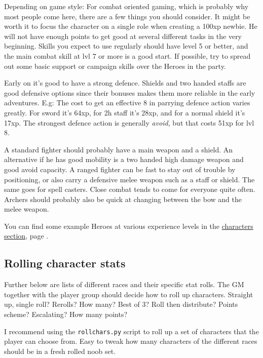 Depending on game style: For combat oriented gaming, which is probably why most people come here, there are a few things you should consider. It might be worth it to focus the character on a single role when creating a 100xp newbie. He will not have enough points to get good at several different tasks in the very beginning. Skills you expect to use regularly should have level 5 or better, and the main combat skill at lvl 7 or more is a good start. If possible, try to spread out some basic support or campaign skills over the Heroes in the party.

Early on it's good to have a strong defence. Shields and two handed staffs are good defensive options since their bonuses makes them more reliable in the early adventures. E.g: The cost to get an effective 8 in parrying defence action varies greatly. For sword it's 64xp, for 2h staff it's 28xp, and for a normal shield it's 17xp. The strongest defence action is generally \emph{avoid}, but that costs 51xp for lvl 8.

A standard fighter should probably have a main weapon and a shield. An alternative if he has good mobility is a two handed high damage weapon and good avoid capacity. A ranged fighter can be fast to stay out of trouble by positioning, or also carry a defensive melee weapon such as a staff or shield. The same goes for spell casters. Close combat tends to come for everyone quite often. Archers should probably also be quick at changing between the bow and the melee weapon.

You can find some example Heroes at various experience levels in the \hyperref[cpt:characters]{characters section}, page \pageref{cpt:characters}.


\subsection*{Rolling character stats}
Further below are lists of different races and their specific stat rolls. The GM together with the player group should decide how to roll up characters. Straight up, single roll? Rerolls? How many? Best of 3? Roll then distribute? Points scheme? Escalating? How many points?

I recommend using the \verb|rollchars.py| script to roll up a set of characters that the player can choose from. Easy to tweak how many characters of the different races should be in a fresh rolled noob set.


